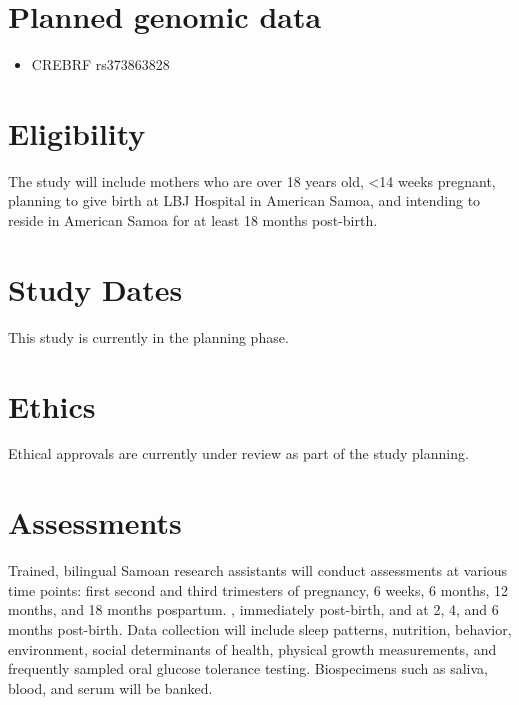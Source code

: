 \documentclass[
  letterpaper,
  DIV=11,
  numbers=noendperiod]{scrreprt}
\providecommand{\tightlist}{%
  \setlength{\itemsep}{0pt}\setlength{\parskip}{0pt}}\usepackage{longtable,booktabs,array}
\begin{document}
\section*{Planned genomic data}\label{planned-genomic-data-1}


\begin{itemize}
\tightlist
\item
  CREBRF rs373863828
\end{itemize}

\section*{Eligibility}\label{eligibility-2}


The study will include mothers who are over 18 years old, \textless14
weeks pregnant, planning to give birth at LBJ Hospital in American
Samoa, and intending to reside in American Samoa for at least 18 months
post-birth.

\section*{Study Dates}\label{study-dates-2}


This study is currently in the planning phase.

\section*{Ethics}\label{ethics-2}


Ethical approvals are currently under review as part of the study
planning.

\section*{Assessments}\label{assessments-2}


Trained, bilingual Samoan research assistants will conduct assessments
at various time points: first second and third trimesters of pregnancy,
6 weeks, 6 months, 12 months, and 18 months pospartum. , immediately
post-birth, and at 2, 4, and 6 months post-birth. Data collection will
include sleep patterns, nutrition, behavior, environment, social
determinants of health, physical growth measurements, and frequently
sampled oral glucose tolerance testing. Biospecimens such as saliva,
blood, and serum will be banked.
\end{document}
